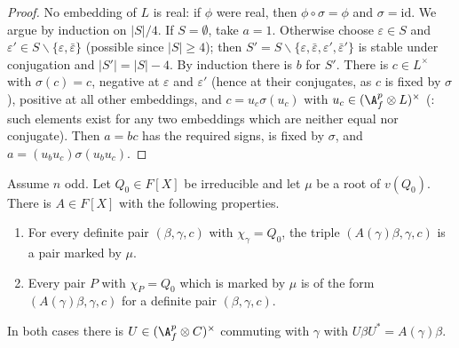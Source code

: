 \begin{proof}
No embedding of $L$ is real: if $\phi$ were real, then $\phi\circ\sigma=\phi$ and $\sigma=\mathrm{id}$. We argue by induction on $|S|/4$. If $S=\emptyset$, take
$a=1$. Otherwise choose $\varepsilon\in S$ and $\varepsilon'\in S\smallsetminus\{\varepsilon,\bar\varepsilon\}$ (possible since $|S|\ge4$); then
$S'=S\smallsetminus\{\varepsilon,\bar\varepsilon,\varepsilon',\bar\varepsilon'\}$ is stable under conjugation and $|S'|=|S|-4$. By induction there is $b$ for $S'$.
There is $c\in L^\times$ with $\sigma(c)=c$, negative at $\varepsilon$ and $\varepsilon'$ (hence at their conjugates, as $c$ is fixed by $\sigma$), positive at all
other embeddings, and $c=u_c\sigma(u_c)$ with $u_c\in(\ksoneAfp\otimes L)^\times$
(: such elements exist for any two embeddings which are neither equal
nor conjugate). Then $a=bc$ has the required signs, is fixed by $\sigma$, and $a=(u_bu_c)\sigma(u_bu_c)$.
\end{proof}

\begin{lemma}\label{pf:ks1:lem-move}
Assume $n$ odd. Let $Q_0\in F[X]$ be irreducible and let $\mu$ be a root of $v(Q_0)$. There is $A\in F[X]$ with the following
properties.
\begin{enumerate}[label=(\roman*)]
\item For every definite pair $(\beta,\gamma,c)$ with $\chi_\gamma=Q_0$, the triple $(A(\gamma)\beta,\gamma,c)$ is a pair marked by $\mu$.
\item Every pair $P$ with $\chi_P=Q_0$ which is marked by $\mu$ is of the form $(A(\gamma)\beta,\gamma,c)$ for a definite pair $(\beta,\gamma,c)$.
\end{enumerate}
In both cases there is $U\in(\ksoneAfp\otimes C)^\times$ commuting with $\gamma$ with $U\beta U^*=A(\gamma)\beta$.
\end{lemma}

